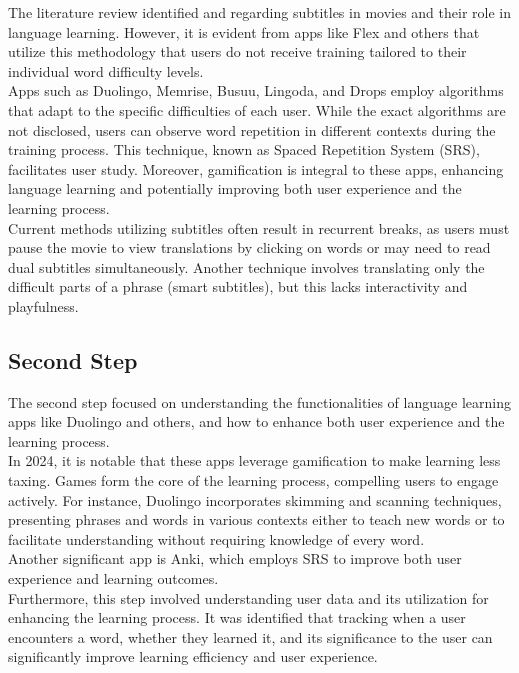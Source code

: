 \documentclass[12pt]{article}
\begin{document}
The literature review identified \cite{ElBatanony21} and \cite{Kovacs14} regarding subtitles in movies and their role in language learning. However, it is evident from apps like Flex and others that utilize this methodology that users do not receive training tailored to their individual word difficulty levels.  \\
Apps such as Duolingo, Memrise, Busuu, Lingoda, and Drops employ algorithms that adapt to the specific difficulties of each user. While the exact algorithms are not disclosed, users can observe word repetition in different contexts during the training process. This technique, known as Spaced Repetition System (SRS), facilitates user study. Moreover, gamification is integral to these apps, enhancing language learning and potentially improving both user experience and the learning process. \\
Current methods utilizing subtitles often result in recurrent breaks, as users must pause the movie to view translations by clicking on words or may need to read dual subtitles simultaneously. Another technique involves translating only the difficult parts of a phrase (smart subtitles), but this lacks interactivity and playfulness. 
\subsection{Second Step}

The second step focused on understanding the functionalities of language learning apps like Duolingo and others, and how to enhance both user experience and the learning process. \\
In 2024, it is notable that these apps leverage gamification to make learning less taxing. Games form the core of the learning process, compelling users to engage actively. For instance, Duolingo incorporates skimming and scanning techniques, presenting phrases and words in various contexts either to teach new words or to facilitate understanding without requiring knowledge of every word. \\ 
Another significant app is Anki, which employs SRS to improve both user experience and learning outcomes.  \\
Furthermore, this step involved understanding user data and its utilization for enhancing the learning process. It was identified that tracking when a user encounters a word, whether they learned it, and its significance to the user can significantly improve learning efficiency and user experience.
\end{document}
